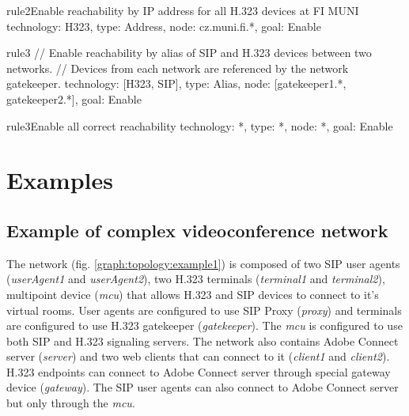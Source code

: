 \documentclass[a4paper]{report}
\begin{document}
\begin{TopologyExample}{rule2}{Enable reachability by IP address for all H.323 devices at FI MUNI}
technology: H323,
type: Address,
node: cz.muni.fi.*,
goal: Enable
\end{TopologyExample}

\begin{TopologyExample}{rule3}{}
// Enable reachability by alias of SIP and H.323 devices between two networks.
// Devices from each network are referenced by the network gatekeeper.
technology: [H323, SIP],
type: Alias,
node: [gatekeeper1.*, gatekeeper2.*],
goal: Enable
\end{TopologyExample}

\begin{TopologyExample}{rule3}{Enable all correct reachability}
technology: *,
type: *,
node: *,
goal: Enable
\end{TopologyExample}


\section{Examples}

\subsection{Example of complex videoconference network}

The network (fig. \ref{graph:topology:example1}) is composed of two SIP user agents (\emph{userAgent1} and \emph{userAgent2}), two H.323 terminals (\emph{terminal1} and \emph{terminal2}), multipoint device (\emph{mcu}) that allows H.323 and SIP devices to connect to it's virtual rooms. User agents are configured to use SIP Proxy (\emph{proxy}) and terminals are configured to use H.323 gatekeeper (\emph{gatekeeper}). The \emph{mcu} is configured to use both SIP and H.323 signaling servers. The network also contains Adobe Connect server (\emph{server}) and two web clients that can connect to it (\emph{client1} and \emph{client2}). H.323 endpoints can connect to Adobe Connect server through special gateway device (\emph{gateway}). The SIP user agents can also connect to Adobe Connect server but only through the \emph{mcu}.
\end{document}
